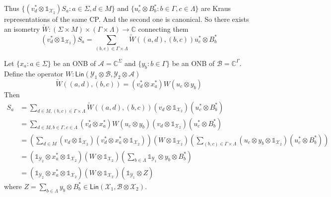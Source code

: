 \documentclass[aps,pra,onecolumn,notitlepage,superscriptaddress]{revtex4-1}
\newcommand{\C}{\mathbb{C}}
\newcommand{\spc}[1]{\mathcal{#1}}
\newcommand{\Lin}{\mathsf{Lin}}
\newcommand\I{\mathds{1}}
\begin{document}
    Thus $\{ (v_d^* \otimes \I_{\spc X_2})S_a : a \in \Sigma, d \in M \}$ and $\{ u_c^* \otimes B_b^* : b \in \Gamma, c \in \Lambda \}$ are Kraus representations of the same CP. And the second one is canonical. So there exists an isometry $\widetilde{W} : (\Sigma \times M) \times (\Gamma \times \Lambda) \to \C $ connecting them
    \begin{equation}
        (v_d^* \otimes \I_{\spc X_2})S_a = \sum_{(b,c) \in \Gamma \times \Lambda} \widetilde{W}((a,d),(b,c)) u_c^* \otimes B_b^*
    \end{equation}

    Let $\{x_a : a \in \Sigma \}$ be an ONB of $\spc A = \C^\Sigma$ and $\{ y_b : b \in \Gamma \}$ be an ONB of $\spc B = \C^\Gamma$. Define the operator $W : \Lin(\spc Y_1 \otimes \spc B, \spc Y_2 \otimes \spc A)$
    \begin{equation}
        \widetilde{W}((a,d),(b,c)) = (v_d^* \otimes x_a^*) W (u_c \otimes y_b)
    \end{equation}
    Then
    \begin{align*}
        S_a 
        &= \sum_{d \in M, (b,c) \in \Gamma \times \Lambda} \widetilde{W}((a,d),(b,c)) (v_d \otimes \I_{\spc X_2}) (u_c^* \otimes B_b^*) \\
        &= \sum_{d \in M, b \in \Gamma, c \in \Lambda} 
        (v_d^* \otimes x_a^*) W
        (u_c \otimes y_b) 
        (v_d \otimes \I_{\spc X_2}) 
        (u_c^* \otimes B_b^*) \\
        &= \left( 
        \sum_{d \in M} 
        (v_d \otimes \I_{\spc X_2})
        (v_d^* \otimes x_a^* \otimes \I_{\spc X_2})
        \right) 
        (W \otimes \I_{\spc X_2})
        \left( 
        \sum_{(b,c) \in \Gamma \times \Lambda} 
        (u_c \otimes y_b  \otimes \I_{\spc X_2})
        (u_c^* \otimes B_b^*)
        \right) \\
        &= (\I_{\spc Y_2} \otimes x_a^* \otimes \I_{\spc X_2})  
        (W \otimes \I_{\spc X_2})
        \left( \sum_{b \in \Lambda} \I_{\spc Y_1} \otimes y_b \otimes B_b^* \right) \\
        &= (\I_{\spc Y_2} \otimes x_a^* \otimes \I_{\spc X_2})  
        (W \otimes \I_{\spc X_2})
        (\I_{\spc Y_1} \otimes Z)
    \end{align*}
    where $Z = \sum_{b \in \Lambda} y_b \otimes B_b^* \in \Lin(\spc X_1, \spc B \otimes \spc X_2)$.
\end{document}
